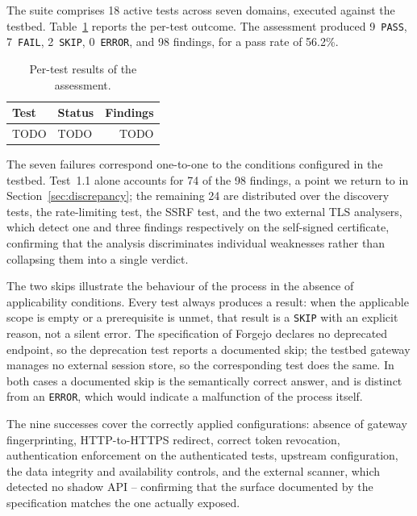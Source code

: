 \documentclass[
]{ceurart}
\begin{document}
The suite comprises 18 active tests across seven domains, executed against the testbed.
Table~\ref{tab:results} reports the per-test outcome.
The assessment produced 9~\texttt{PASS}, 7~\texttt{FAIL}, 2~\texttt{SKIP}, 0~\texttt{ERROR}, and 98 findings, for a pass rate of 56.2\%.

\begin{table}
  \caption{Per-test results of the assessment.}
  \label{tab:results}
  \begin{tabular}{llr}
    \toprule
    \textbf{Test} & \textbf{Status} & \textbf{Findings} \\
    \midrule
    TODO          & TODO            & TODO              \\
    \bottomrule
  \end{tabular}
\end{table}

The seven failures correspond one-to-one to the conditions configured in the testbed.
Test~1.1 alone accounts for 74 of the 98 findings, a point we return to in Section~\ref{sec:discrepancy}; the remaining 24 are distributed over the discovery tests, the rate-limiting test, the SSRF test, and the two external TLS analysers, which detect one and three findings respectively on the self-signed certificate, confirming that the analysis discriminates individual weaknesses rather than collapsing them into a single verdict.

The two skips illustrate the behaviour of the process in the absence of applicability conditions.
Every test always produces a result: when the applicable scope is empty or a prerequisite is unmet, that result is a \texttt{SKIP} with an explicit reason, not a silent error.
The specification of Forgejo declares no deprecated endpoint, so the deprecation test reports a documented skip; the testbed gateway manages no external session store, so the corresponding test does the same.
In both cases a documented skip is the semantically correct answer, and is distinct from an \texttt{ERROR}, which would indicate a malfunction of the process itself.

The nine successes cover the correctly applied configurations: absence of gateway fingerprinting, HTTP-to-HTTPS redirect, correct token revocation, authentication enforcement on the authenticated tests, upstream configuration, the data integrity and availability controls, and the external scanner, which detected no shadow API -- confirming that the surface documented by the specification matches the one actually exposed.
\end{document}
